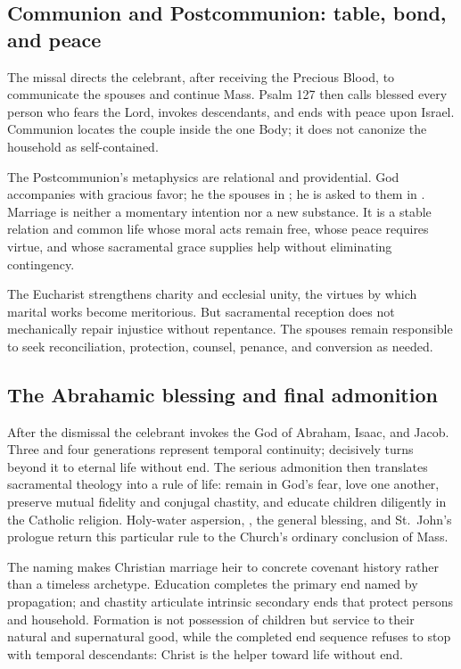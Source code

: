 \sectionguard
\subsection*{Communion and Postcommunion: table, bond, and peace\enspace{}}

The missal directs the celebrant, after receiving the Precious Blood, to communicate the spouses and continue Mass. Psalm 127 then calls blessed every person who fears the Lord, invokes descendants, and ends with peace upon Israel. Communion locates the couple inside the one Body; it does not canonize the household as self-contained.

The Postcommunion's metaphysics are relational and providential. God accompanies  with gracious favor; he  the spouses in ; he is asked to  them in . Marriage is neither a momentary intention nor a new substance. It is a stable relation and common life whose moral acts remain free, whose peace requires virtue, and whose sacramental grace supplies help without eliminating contingency.

The Eucharist strengthens charity and ecclesial unity, the virtues by which marital works become meritorious. But sacramental reception does not mechanically repair injustice without repentance. The spouses remain responsible to seek reconciliation, protection, counsel, penance, and conversion as needed.

\sectionguard
\subsection*{The Abrahamic blessing and final admonition\enspace{}}

After the dismissal the celebrant invokes the God of Abraham, Isaac, and Jacob. Three and four generations represent temporal continuity;  decisively turns beyond it to eternal life without end. The serious admonition then translates sacramental theology into a rule of life: remain in God's fear, love one another, preserve mutual fidelity and conjugal chastity, and educate children diligently in the Catholic religion. Holy-water aspersion, , the general blessing, and St.~John's prologue return this particular rule to the Church's ordinary conclusion of Mass.

The naming makes Christian marriage heir to concrete covenant history rather than a timeless archetype. Education completes the primary end named by propagation;  and chastity articulate intrinsic secondary ends that protect persons and household. Formation is not possession of children but service to their natural and supernatural good, while the completed end sequence refuses to stop with temporal descendants: Christ is the helper toward life without end.

